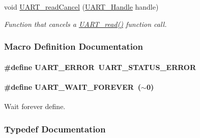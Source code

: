 \begin{DoxyCompactItemize}
void \hyperlink{_u_a_r_t_8h_a51ed7e94d5b409ca1fcb2d65c5a25c3c}{U\+A\+R\+T\+\_\+read\+Cancel} (\hyperlink{_u_a_r_t_8h_a13cc669fae768d8212e6491ce71b28af}{U\+A\+R\+T\+\_\+\+Handle} handle)
\begin{DoxyCompactList}\small\item\em Function that cancels a \hyperlink{_u_a_r_t_8h_a023152d57539cad94bdd813956013e73}{U\+A\+R\+T\+\_\+read()} function call. \end{DoxyCompactList}\end{DoxyCompactItemize}


\subsubsection{Macro Definition Documentation}
\paragraph[{U\+A\+R\+T\+\_\+\+E\+R\+R\+O\+R}]{\setlength{\rightskip}{0pt plus 5cm}\#define U\+A\+R\+T\+\_\+\+E\+R\+R\+O\+R~{\bf U\+A\+R\+T\+\_\+\+S\+T\+A\+T\+U\+S\+\_\+\+E\+R\+R\+O\+R}}\label{_u_a_r_t_8h_a7e3562e7931cf51b41a32d8109072251}
\paragraph[{U\+A\+R\+T\+\_\+\+W\+A\+I\+T\+\_\+\+F\+O\+R\+E\+V\+E\+R}]{\setlength{\rightskip}{0pt plus 5cm}\#define U\+A\+R\+T\+\_\+\+W\+A\+I\+T\+\_\+\+F\+O\+R\+E\+V\+E\+R~($\sim$0)}\label{_u_a_r_t_8h_ada620b673241eb6335a71e75da291716}


Wait forever define. 



\subsubsection{Typedef Documentation}
